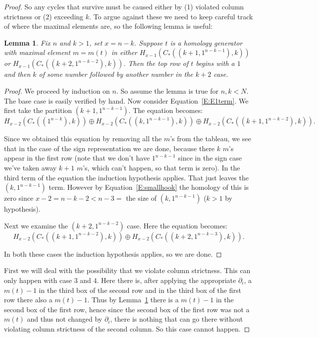 \documentclass{amsart}
\newtheorem{lemma}[theorem]{Lemma}
\begin{document}
\begin{proof}
  So any cycles that survive must be caused either by (1) violated column strictness or (2) exceeding $k$. To argue against
  these we need to keep careful track of where the maximal elements are, so the following lemma is useful:

  \begin{lemma}\label{L:toprow1}
    Fix $n$ and $k > 1$, set $x=n-k$. Suppose $t$ is a homology generator with maximal element $m=m(t)$ in either 
    $H_{x-1}(C_*((k+1, 1^{n-k-1}),k))$ or $H_{x-1}(C_*((k+2, 1^{n-k-2}),k))$. Then the top row of $t$ begins with a $1$ 
    and then $k$ of some number followed by another number in the $k+2$ case. 
  \end{lemma}
  \begin{proof}
    We proceed by induction on $n$. So assume the lemma is true for $n, k < N$. The base case is easily verified by hand.
    Now consider Equation~\ref{E:E1term}. We first take the partition $(k+1, 1^{n-k-1})$. The equation becomes: 
    \begin{equation}\label{E:E1term-hookcase-1}
      H_{x-2}(C_*((1^{n-k}),k)) \oplus 
      H_{x-2}(C_*((k, 1^{n-k-1}),k)) \oplus H_{x-2}(C_*((k+1, 1^{n-k-2}),k)).
    \end{equation}

    Since we obtained this equation by removing all the $m$'s from the tableau, we see that in the case of the  sign 
    representation we are done, because there $k$ $m$'s appear in the first row (note that we don't have $1^{n-k-1}$ since in the  sign case we've 
    taken away $k+1$ $m$'s, which can't happen, so that term is zero). In the third term of the equation the induction 
    hypothesis applies. That just leaves the $(k, 1^{n-k-1})$ term. However by 
    Equation~\ref{E:smallhook} the homology of this is zero since $x-2 = n-k -2 < n-3 = $ the size of $(k, 1^{n-k-1})$
    ($k>1$ by hypothesis).

    Next we examine the $(k+2, 1^{n-k-2})$ case. Here the equation becomes: 
    \begin{equation}\label{E:E1term-hookcase-2} 
      H_{x-2}(C_*((k+1, 1^{n-k-2}),k)) \oplus H_{x-2}(C_*((k+2, 1^{n-k-3}),k)).
    \end{equation}
     
    In both these cases the induction hypothesis applies, so we are done.
  
\end{proof} 
  

  First we will deal with the possibility that we violate column strictness. This can only happen with case 3 and 4. Here
  there is, after applying the appropriate $\partial_i$,  a $m(t)-1$ in the third box of the second row and in the third box 
  of the first row there also a $m(t)-1$. Thus by Lemma~\ref{L:toprow1} there is a $m(t)-1$ in the second box of the first row, 
  hence since the second box of the first row was not a $m(t)$ and thus not changed by $\partial_i$, there is nothing that can
  go there without violating column strictness of the second column. So this case cannot happen.


\end{proof}
\end{document}
